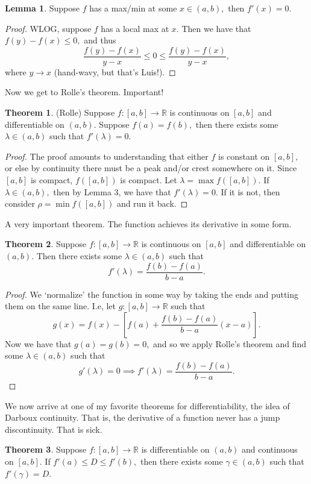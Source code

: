 \documentclass[10pt, oneside]{article}
\newcommand{\bbR}{\mathbb{R}}
\theoremstyle{definition}
\newtheorem{thm}{Theorem}
\newtheorem{lem}{Lemma}
\begin{document}
\begin{lem}
    Suppose $f$ has a max/min at some $x\in (a,b),$ then $f'(x) = 0.$
\end{lem}
\begin{proof}
    WLOG, suppose $f$ has a local max at $x.$ Then we have that $f(y) - f(x)\leq 0,$ and thus 
    \[\frac{f(y) - f(x)}{y-x}\leq 0 \leq \frac{f(y) - f(x)}{y-x},\] where $y\to x$ (hand-wavy, but that's Luis!).
\end{proof}
Now we get to Rolle's theorem. Important!
\begin{thm}
    (Rolle) Suppose $f:[a,b]\to \bbR$ is continuous on $[a,b]$ and differentiable on $(a,b).$ Suppose $f(a) = f(b),$ then there exists some $\lambda \in (a,b)$ such that $f'(\lambda) = 0.$
\end{thm}
\begin{proof}
    The proof amounts to understanding that either $f$ is constant on $[a,b],$ or else by continuity there must be a peak and/or crest somewhere on it. Since $[a,b]$ is compact, $f([a,b])$ is compact. Let $\lambda = \max f([a,b]).$ If $\lambda \in (a,b),$ then by Lemma 3, we have that $f'(\lambda) = 0.$ If it is not, then consider $\rho = \min f([a,b])$ and run it back. 
\end{proof}
A very important theorem. The function achieves its derivative in some form.
\begin{thm}
    Suppose $f:[a,b]\to \bbR$ is continuous on $[a,b]$ and differentiable on $(a,b).$ Then there exists some $\lambda \in (a,b)$ such that 
    \[f'(\lambda) = \frac{f(b) - f(a)}{b-a}.\]
\end{thm}
\begin{proof}
    We `normalize' the function in some way by taking the ends and putting them on the same line. I.e, let $g:[a,b]\to \bbR$ such that 
    \[g(x) = f(x) - \left[ f(a) + \frac{f(b) - f(a)}{b-a}(x-a)\right].\] Now we have that $g(a) = g(b) = 0,$ and so we apply Rolle's theorem and find some $\lambda \in (a,b)$ such that 
    \[g'(\lambda) = 0 \implies f'(\lambda) = \frac{f(b) - f(a)}{b-a}.\]
\end{proof}
We now arrive at one of my favorite theorems for differentiability, the idea of Darboux continuity. That is, the derivative of a function never has a jump discontinuity. That is sick.
\begin{thm}
    Suppose $f: [a,b]\to \bbR$ is differentiable on $(a,b)$ and continuous on $[a,b].$ If $f'(a) \leq D \leq f'(b),$ then there exists some $\gamma \in (a,b)$ such that $f'(\gamma) = D.$
\end{thm}
\end{document}
